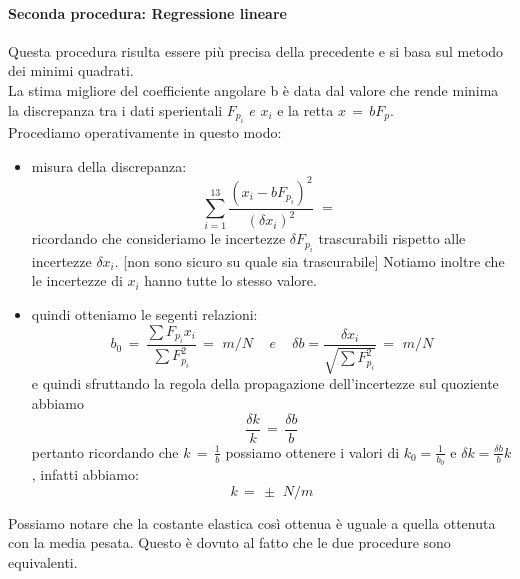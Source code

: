 \paragraph{Seconda procedura: Regressione lineare\\}
Questa procedura risulta essere più precisa della precedente e si basa sul metodo dei minimi quadrati.\\
La stima migliore del coefficiente angolare b è data dal valore che rende minima la discrepanza tra i dati sperientali $F_{p_i} \,\,e\,\, x_i$ e la retta $x \,=\, bF_p$.\\
Procediamo operativamente in questo modo:
\begin{itemize}
	\item{misura della discrepanza:
			\begin{equation*}
				\sum_{i=1}^{13} \frac{(x_i - bF_{p_i})^2}{(\delta x_i)^2} \,\,=\,\,		
			\end{equation*}
			ricordando che consideriamo le incertezze $\delta F_{p_i}$ trascurabili rispetto alle incertezze $\delta x_i$. [non sono sicuro su quale sia trascurabile] Notiamo inoltre che le incertezze di $x_i$ hanno tutte lo stesso valore.}
	\item{quindi otteniamo le segenti relazioni:
			\begin{equation*}
				b_0  \,=\,  \frac{\sum F_{p_i}  x_i}{\sum F_{p_i}^2} \,=\,  \, m/N \,\,\,\,\,\,\, e \,\,\,\,\,\,\,
				\delta b  =  \frac{\delta x_i}{\sqrt{\sum F_{p_i}^2}} \,=\,  \, m/N
			\end{equation*}
			e quindi sfruttando la regola della propagazione dell'incertezze sul quoziente abbiamo
			\begin{equation*}
				\frac{\delta k}{k} \,=\, \frac{\delta b}{b}
			\end{equation*}
			pertanto ricordando che $k \,=\, \frac{1}{b}$ possiamo ottenere i valori di $k_0 = \frac{1}{b_0}$ e $\delta k = \frac{\delta b}{b} k$, infatti abbiamo:
			\begin{equation*}
				k \,=\,  \pm  \,\,N/m
			\end{equation*}
			}
\end{itemize}
Possiamo notare che la costante elastica così ottenua è uguale a quella ottenuta con la media pesata. Questo è dovuto al fatto che le due procedure sono equivalenti.

